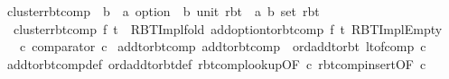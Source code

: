 \begin{isabellebody}
\isanewline
{}\isamarkupfalse%
\ cluster{\isacharunderscore}{\kern0pt}rbt{\isacharunderscore}{\kern0pt}comp\ {\isacharcolon}{\kern0pt}{\isacharcolon}{\kern0pt}\ {\isachardoublequoteopen}{\isacharparenleft}{\kern0pt}{\isacharprime}{\kern0pt}b\ {\isasymRightarrow}\ {\isacharprime}{\kern0pt}a\ option{\isacharparenright}{\kern0pt}\ {\isasymRightarrow}\ {\isacharparenleft}{\kern0pt}{\isacharprime}{\kern0pt}b{\isacharcomma}{\kern0pt}\ unit{\isacharparenright}{\kern0pt}\ rbt\ {\isasymRightarrow}\ {\isacharparenleft}{\kern0pt}{\isacharprime}{\kern0pt}a{\isacharcomma}{\kern0pt}\ {\isacharprime}{\kern0pt}b\ set{\isacharparenright}{\kern0pt}\ rbt{\isachardoublequoteclose}\ \isanewline
\ \ {\isachardoublequoteopen}cluster{\isacharunderscore}{\kern0pt}rbt{\isacharunderscore}{\kern0pt}comp\ f\ t\ {\isacharequal}{\kern0pt}\ RBT{\isacharunderscore}{\kern0pt}Impl{\isachardot}{\kern0pt}fold\ {\isacharparenleft}{\kern0pt}add{\isacharunderscore}{\kern0pt}option{\isacharunderscore}{\kern0pt}to{\isacharunderscore}{\kern0pt}rbt{\isacharunderscore}{\kern0pt}comp\ f{\isacharparenright}{\kern0pt}\ t\ RBT{\isacharunderscore}{\kern0pt}Impl{\isachardot}{\kern0pt}Empty{\isachardoublequoteclose}\isanewline
\isanewline
{}\isamarkupfalse%
\isanewline
\ \ \ c{\isacharcolon}{\kern0pt}\ {\isachardoublequoteopen}comparator\ c{\isachardoublequoteclose}\isanewline
{}\isanewline
\isanewline
{}\isamarkupfalse%
\ add{\isacharunderscore}{\kern0pt}to{\isacharunderscore}{\kern0pt}rbt{\isacharunderscore}{\kern0pt}comp{\isacharcolon}{\kern0pt}\ {\isachardoublequoteopen}add{\isacharunderscore}{\kern0pt}to{\isacharunderscore}{\kern0pt}rbt{\isacharunderscore}{\kern0pt}comp\ {\isacharequal}{\kern0pt}\ ord{\isachardot}{\kern0pt}add{\isacharunderscore}{\kern0pt}to{\isacharunderscore}{\kern0pt}rbt\ {\isacharparenleft}{\kern0pt}lt{\isacharunderscore}{\kern0pt}of{\isacharunderscore}{\kern0pt}comp\ c{\isacharparenright}{\kern0pt}{\isachardoublequoteclose}\isanewline
%
\isadelimproof
\ \ %
\endisadelimproof
%
\isatagproof
{}\isamarkupfalse%
\ add{\isacharunderscore}{\kern0pt}to{\isacharunderscore}{\kern0pt}rbt{\isacharunderscore}{\kern0pt}comp{\isacharunderscore}{\kern0pt}def\ ord{\isachardot}{\kern0pt}add{\isacharunderscore}{\kern0pt}to{\isacharunderscore}{\kern0pt}rbt{\isacharunderscore}{\kern0pt}def\ rbt{\isacharunderscore}{\kern0pt}comp{\isacharunderscore}{\kern0pt}lookup{\isacharbrackleft}{\kern0pt}OF\ c{\isacharbrackright}{\kern0pt}\ rbt{\isacharunderscore}{\kern0pt}comp{\isacharunderscore}{\kern0pt}insert{\isacharbrackleft}{\kern0pt}OF\ c{\isacharbrackright}{\kern0pt}\isanewline

\end{isabellebody}
